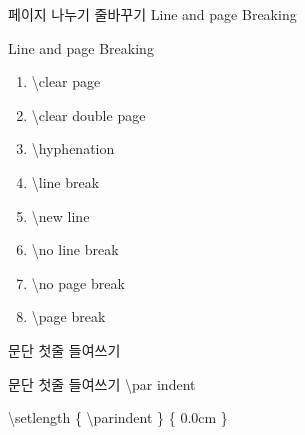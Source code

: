 \documentclass[ aspectratio=149,  14pt,blue,xcolor=pdftex,dvipsnames,table,handout,notes]{beamer}
\begin{document}


		\begin{frame}[t]{페이지 나누기 줄바꾸기 Line and page Breaking}

			\begin{block} {Line and page Breaking}
			\begin{enumerate}
			\item	\textbackslash clear page
			\item	\textbackslash clear double page
			\item	\textbackslash hyphenation
			\item	\textbackslash line break
			\item	\textbackslash new line
			\item	\textbackslash no line break
			\item	\textbackslash no page break
			\item	\textbackslash page break
			\end{enumerate}
			\end{block}

		\end{frame}

		\begin{frame}[t]{문단 첫줄 들여쓰기}

			\begin{block} {문단 첫줄 들여쓰기}
			\textbackslash par indent
			\end{block}

			\begin{example}
			\textbackslash setlength \{ \textbackslash parindent \} \{ 0.0cm \}\\
			\end{example}

		
		\end{frame}
\end{document}
